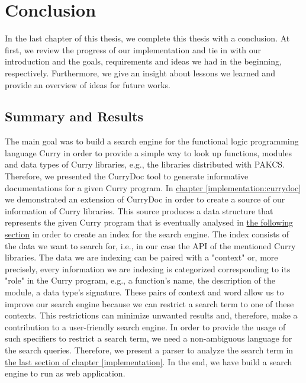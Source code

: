 \documentclass[%
	latex,%
	a4paper,%
	oneside,%
	chapterprefix,%
	headsepline,%
	12pt%
]{scrbook}
\newcommand{\textss}[1]{"#1"}
\begin{document}
\chapter{Conclusion}\label{conclusion}

In the last chapter of this thesis, we complete this thesis with a
conclusion. %
At first, we review the progress of our implementation and tie in with
our introduction and the goals, requirements and ideas we had in the
beginning, respectively. %
Furthermore, we give an insight about lessons we learned and provide
an overview of ideas for future works. %

\section{Summary and Results}

The main goal was to build a search engine for the functional logic
programming language Curry in order to provide a simple way to look up
functions, modules and data types of Curry libraries, e.g.,
the libraries distributed with PAKCS. %
Therefore, we presented the CurryDoc tool to generate informative
documentations for a given Curry program. %
In \hyperref[implementation:currydoc]{chapter
  \ref{implementation:currydoc}} we demonstrated an extension of
CurryDoc in order to create a source of our information of Curry
libraries. %
This source produces a data structure that represents the given Curry
program that is eventually analysed in
\hyperref[implementation:index]{the following section} in order to
create an index for the search engine. %
The index consists of the data we want to search for, i.e., in our
case the API of the mentioned Curry libraries. %
The data we are indexing can be paired with a \textss{context} or,
more precisely, every information we are indexing is categorized
corresponding to its \textss{role} in the Curry program, e.g., a
function's name, the description of the module, a data type's
signature. %
These pairs of context and word allow us to improve our search engine
because we can restrict a search term to one of these contexts. %
This restrictions can minimize unwanted results and, therefore, make a
contribution to a user-friendly search engine. %
In order to provide the usage of such specifiers to restrict a search
term, we need a non-ambiguous language for the search queries. %
Therefore, we present a parser to analyze the search term in
\hyperref[implementation:parser]{the last section of chapter
  \ref{implementation}}. %
In the end, we have build a search engine to run as web
application. \\ %
\end{document}
